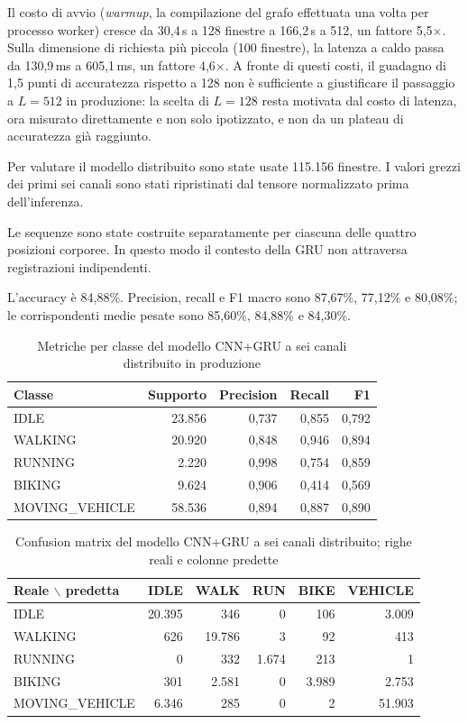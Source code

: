 \documentclass[conference]{IEEEtran}
\begin{document}
Il costo di avvio (\emph{warmup}, la compilazione del grafo effettuata
una volta per processo worker) cresce da 30,4\,s a 128 finestre a
166,2\,s a 512, un fattore 5,5$\times$. Sulla dimensione di richiesta
più piccola (100 finestre), la latenza a caldo passa da 130,9\,ms a
605,1\,ms, un fattore 4,6$\times$. A fronte di questi costi, il
guadagno di 1,5 punti di accuratezza rispetto a 128 non è sufficiente
a giustificare il passaggio a $L=512$ in produzione: la scelta di
$L=128$ resta motivata dal costo di latenza, ora misurato direttamente
e non solo ipotizzato, e non da un plateau di accuratezza già
raggiunto.

Per valutare il modello distribuito sono state usate 115.156 finestre.
I valori grezzi dei primi sei canali sono stati ripristinati dal
tensore normalizzato prima dell'inferenza.

Le sequenze sono state costruite separatamente per ciascuna delle
quattro posizioni corporee. In questo modo il contesto della GRU non
attraversa registrazioni indipendenti.

L'accuracy è 84,88\%. Precision, recall e F1 macro sono 87,67\%,
77,12\% e 80,08\%; le corrispondenti medie pesate sono 85,60\%,
84,88\% e 84,30\%.

\begin{table}[htbp]
\caption{Metriche per classe del modello CNN+GRU a sei canali distribuito in produzione}
\centering
\scriptsize
\begin{tabular}{|l|r|r|r|r|}
\hline
\textbf{Classe} & \textbf{Supporto} & \textbf{Precision} & \textbf{Recall} & \textbf{F1} \\
\hline
IDLE & 23.856 & 0,737 & 0,855 & 0,792 \\
WALKING & 20.920 & 0,848 & 0,946 & 0,894 \\
RUNNING & 2.220 & 0,998 & 0,754 & 0,859 \\
BIKING & 9.624 & 0,906 & 0,414 & 0,569 \\
MOVING\_VEHICLE & 58.536 & 0,894 & 0,887 & 0,890 \\
\hline
\end{tabular}
\label{tab:har-metrics}
\end{table}

\begin{table}[htbp]
\caption{Confusion matrix del modello CNN+GRU a sei canali distribuito; righe reali e colonne predette}
\centering
\scriptsize
\begin{tabular}{|l|r|r|r|r|r|}
\hline
\textbf{Reale $\backslash$ predetta} & \textbf{IDLE} & \textbf{WALK} & \textbf{RUN} & \textbf{BIKE} & \textbf{VEHICLE} \\
\hline
IDLE & 20.395 & 346 & 0 & 106 & 3.009 \\
WALKING & 626 & 19.786 & 3 & 92 & 413 \\
RUNNING & 0 & 332 & 1.674 & 213 & 1 \\
BIKING & 301 & 2.581 & 0 & 3.989 & 2.753 \\
MOVING\_VEHICLE & 6.346 & 285 & 0 & 2 & 51.903 \\
\hline
\end{tabular}
\label{tab:har-confusion}
\end{table}
\end{document}
